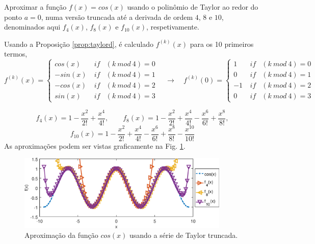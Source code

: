 \begin{example}
Aproximar a função $f(x)=cos(x)$ usando o polinômio de Taylor ao redor do ponto $a=0$,
numa versão truncada até a derivada de ordem $4$, $8$ e $10$,
denominados aqui $f_4(x)$, $f_8(x)$ e $f_{10}(x)$, respetivamente.
\end{example}
\begin{SolutionT}
Usando a Proposição \ref{prop:taylord}, é calculado $f^{(k)}(x)$ para os 10 primeiros termos,
\begin{equation}
f^{(k)}(x)=
\left\{
\begin{matrix}
cos(x) & ~if & (k~mod~4)=0\\
-sin(x)& ~if & (k~mod~4)=1\\
-cos(x)& ~if & (k~mod~4)=2\\
sin(x) & ~if & (k~mod~4)=3
\end{matrix}
\right.
\quad \rightarrow \quad
f^{(k)}(0)=
\left\{
\begin{matrix}
1 & ~if & (k~mod~4)=0\\
0& ~if & (k~mod~4)=1\\
-1& ~if & (k~mod~4)=2\\
0 & ~if & (k~mod~4)=3
\end{matrix}
\right.
\end{equation}

\begin{equation}
f_{4}(x)=
1
-\frac{x^{2}}{2!} 
+\frac{x^{4}}{4!},
\qquad 
f_{8}(x)=
1
-\frac{x^{2}}{2!} 
+\frac{x^{4}}{4!} 
-\frac{x^{6}}{6!} 
+\frac{x^{8}}{8!}, 
\end{equation}
\begin{equation}
f_{10}(x)=
1
-\frac{x^{2}}{2!} 
+\frac{x^{4}}{4!} 
-\frac{x^{6}}{6!} 
+\frac{x^{8}}{8!} 
-\frac{x^{10}}{10!} 
\end{equation}
As aproximações podem ser vistas graficamente na Fig. \ref{fig:taylore}.
\end{SolutionT}

\begin{figure}[!h]
  \centering
    \includegraphics[width=0.90\textwidth]{chapters/funcoes/mcode/taylorR1R1/taylore.eps}
  \caption{Aproximação da função $cos(x)$ usando a série de Taylor truncada.}
    \label{fig:taylore}
\end{figure}
 


